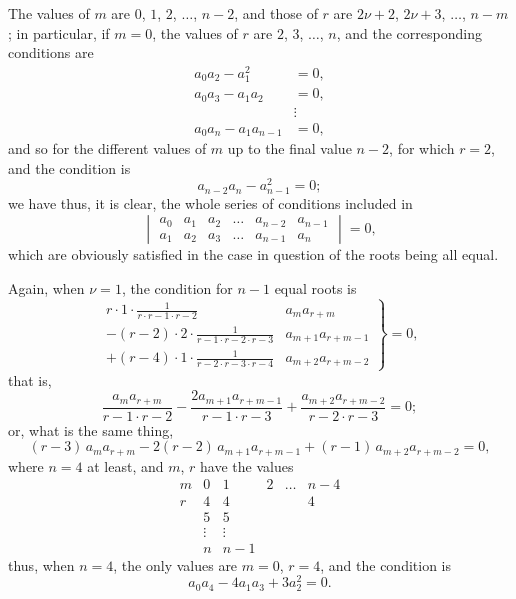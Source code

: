 \documentclass[11pt,a4paper]{book}
\begin{document}
The values of $m$ are $0$, $1$, $2$, $\dots$, $n-2$, and those of $r$ are $2\nu+2$, $2\nu+3$, $\dots$, $n-m$; in particular, if $m=0$, the values of $r$ are $2$, $3$, $\dots$, $n$, and the corresponding conditions are
\begin{align*}
a_{0}a_{2} - a_{1}^{2} &= 0,\\
a_{0}a_{3} - a_{1}a_{2} &= 0,\\
&\vdots\\
a_{0}a_{n} - a_{1}a_{n-1} &= 0,
\end{align*}
and so for the different values of $m$ up to the final value $n-2$, for which $r=2$, and the condition is
\[
a_{n-2}a_{n} - a_{n-1}^{2} = 0;
\]
we have thus, it is clear, the whole series of conditions included in
\[
\begin{vmatrix}
a_{0} & a_{1} & a_{2} & \dots & a_{n-2} & a_{n-1} \\
a_{1} & a_{2} & a_{3} & \dots & a_{n-1} & a_{n}
\end{vmatrix} = 0,
\]
which are obviously satisfied in the case in question of the roots being all equal.

Again, when $\nu=1$, the condition for $n-1$ equal roots is
\[
\left.\begin{aligned}
r \cdot 1 \cdot \frac{1}{r \cdot r-1 \cdot r-2} & a_{m}a_{r+m}\\
- (r-2) \cdot 2 \cdot \frac{1}{r-1 \cdot r-2 \cdot r-3} & a_{m+1}a_{r+m-1}\\
+ (r-4) \cdot 1 \cdot \frac{1}{r-2 \cdot r-3 \cdot r-4} & a_{m+2}a_{r+m-2}
\end{aligned}\right\} = 0,
\]
that is,
\[
\frac{a_{m}a_{r+m}}{r-1 \cdot r-2} - \frac{2a_{m+1}a_{r+m-1}}{r-1 \cdot r-3} + \frac{a_{m+2}a_{r+m-2}}{r-2 \cdot r-3} = 0;
\]
or, what is the same thing,
\[
(r-3)\,a_{m}a_{r+m} - 2(r-2)\,a_{m+1}a_{r+m-1} + (r-1)\,a_{m+2}a_{r+m-2} = 0,
\]
where $n=4$ at least, and $m$, $r$ have the values
\[
\begin{array}{c|ccccc}
m & 0 & 1 & 2 & \dots & n-4 \\ \hline
r & 4 & 4 & & & 4 \\
  & 5 & 5 & & & \\
  & \vdots & \vdots & & & \\
  & n & n-1 & & &
\end{array}
\]
thus, when $n=4$, the only values are $m=0$, $r=4$, and the condition is
\[
a_{0}a_{4} - 4a_{1}a_{3} + 3a_{2}^{2} = 0.
\]
\end{document}
